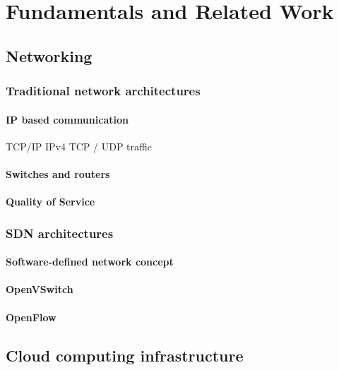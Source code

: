 \chapter{Fundamentals and Related Work}

\section{Networking}

\subsection{Traditional network architectures}

\subsubsection{IP based communication}
TCP/IP
IPv4
TCP / UDP traffic

\subsubsection{Switches and routers}

\subsubsection{Quality of Service}

\subsection{SDN architectures}

\subsubsection{Software-defined network concept}

\subsubsection{OpenVSwitch}

\subsubsection{OpenFlow}

\section{Cloud computing infrastructure}

